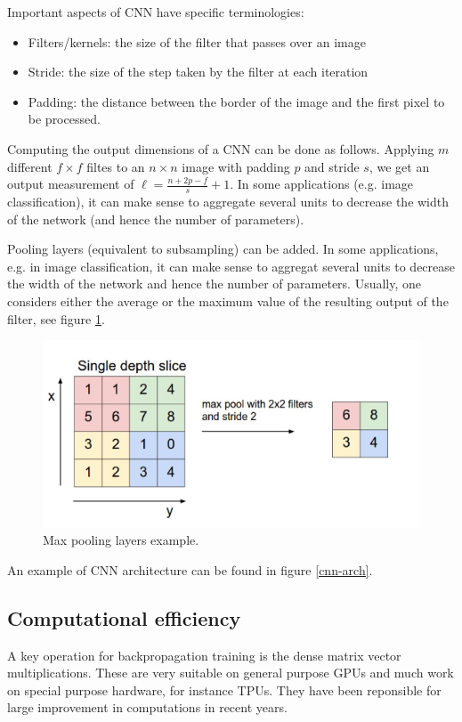 \documentclass[a4paper,10pt,twoside]{article}
\begin{document}
Important aspects of CNN have specific terminologies:
\begin{itemize}
    \item Filters/kernels: the size of the filter that passes over an image
    \item Stride: the size of the step taken by the filter at each iteration
    \item Padding: the distance between the border of the image and the first pixel to be processed.
\end{itemize}

Computing the output dimensions of a CNN can be done as follows. Applying $m$ different $f\times f$ filtes to an $n\times n$ image with padding $p$ and stride $s$, we get an output measurement of $\ell=\frac{n+2p-f}{s}+1$. In some applications (e.g. image classification), it can make sense to aggregate several units to decrease the width of the network (and hence the number of parameters).

Pooling layers (equivalent to subsampling) can be added. In some applications, e.g. in image classification, it can make sense to aggregat several units to decrease the width of the network and hence the number of parameters. Usually, one considers either the average or the maximum value of the resulting output of the filter, see figure \ref{max-pooling-layers}.

\begin{figure}
    \centering
    \includegraphics[width=.5\textwidth]{figures/max-pooling-layers.png}
    \caption{Max pooling layers example.}
    \label{max-pooling-layers}
\end{figure}

An example of CNN architecture can be found in figure \ref{cnn-arch}.

\subsection{Computational efficiency}

A key operation for backpropagation training is the dense matrix vector multiplications. These are very suitable on general purpose GPUs and much work on special purpose hardware, for instance TPUs. They have been reponsible for large improvement in computations in recent years.
\end{document}
